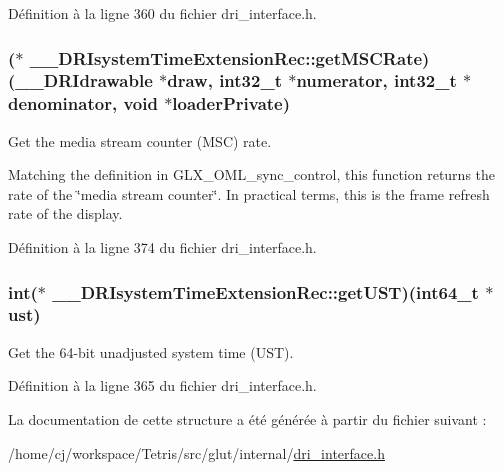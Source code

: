 Définition à la ligne 360 du fichier dri\-\_\-interface.\-h.

\hypertarget{struct_____d_r_isystem_time_extension_rec_a721fc69d9d78768ad190b10d16f9e15c}{
\subsubsection[{get\-M\-S\-C\-Rate}]{($\ast$ \-\_\-\-\_\-\-D\-R\-Isystem\-Time\-Extension\-Rec\-::get\-M\-S\-C\-Rate)({\bf \-\_\-\-\_\-\-D\-R\-Idrawable} $\ast$draw, int32\-\_\-t $\ast$numerator, int32\-\_\-t $\ast$denominator, {\bf void} $\ast$loader\-Private)}}\label{struct_____d_r_isystem_time_extension_rec_a721fc69d9d78768ad190b10d16f9e15c}
Get the media stream counter (M\-S\-C) rate.

Matching the definition in G\-L\-X\-\_\-\-O\-M\-L\-\_\-sync\-\_\-control, this function returns the rate of the \char`\"{}media stream counter\char`\"{}. In practical terms, this is the frame refresh rate of the display. 

Définition à la ligne 374 du fichier dri\-\_\-interface.\-h.

\hypertarget{struct_____d_r_isystem_time_extension_rec_aa5e564ab6277874da231d42c26aeb057}{
\subsubsection[{get\-U\-S\-T}]{\setlength{\rightskip}{0pt plus 5cm}int($\ast$ \-\_\-\-\_\-\-D\-R\-Isystem\-Time\-Extension\-Rec\-::get\-U\-S\-T)(int64\-\_\-t $\ast$ust)}}\label{struct_____d_r_isystem_time_extension_rec_aa5e564ab6277874da231d42c26aeb057}
Get the 64-\/bit unadjusted system time (U\-S\-T). 

Définition à la ligne 365 du fichier dri\-\_\-interface.\-h.



La documentation de cette structure a été générée à partir du fichier suivant \-:\begin{DoxyCompactItemize}
\item 
/home/cj/workspace/\-Tetris/src/glut/internal/\hyperlink{dri__interface_8h}{dri\-\_\-interface.\-h}\end{DoxyCompactItemize}
